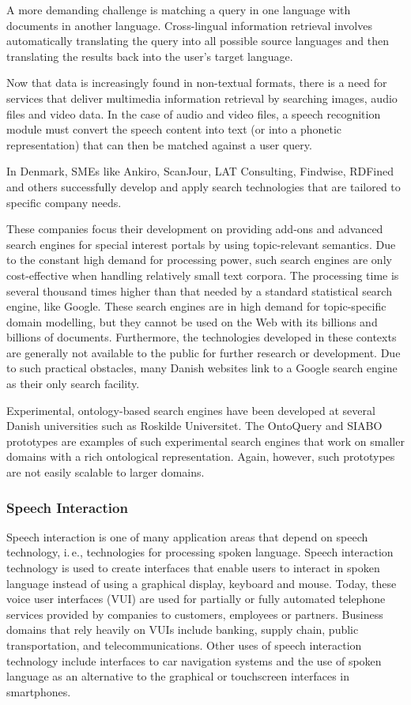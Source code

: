 \begin{multicols}{2}
A more demanding challenge is matching a query in one language with documents in another language. Cross-lingual information retrieval involves automatically translating the query into all possible source languages and then translating the results back into the user's target language.

Now that data is increasingly found in non-textual formats, there is a need for services that deliver multimedia information retrieval by searching images, audio files and video data. In the case of audio and video files, a speech recognition module must convert the speech content into text (or into a phonetic representation) that can then be matched against a user query.

In Denmark, SMEs like Ankiro, ScanJour, LAT Consulting, Findwise, RDFined and others successfully develop and apply search technologies that are tailored to specific company needs.

These companies focus their development on providing add-ons and advanced search engines for special interest portals by using topic-relevant semantics. Due to the constant high demand for processing power, such search engines are only cost-effective when handling relatively small text corpora. The processing time is several thousand times higher than that needed by a standard statistical search engine, like Google. These search engines are in high demand for topic-specific domain modelling, but they cannot be used on the Web with its billions and billions of documents. Furthermore, the technologies developed in these contexts are generally not available to the public for further research or development. Due to such practical obstacles, many Danish websites link to a Google search engine as their only search facility.

Experimental, ontology-based search engines have been developed at several Danish universities such as Roskilde Universitet. The OntoQuery and SIABO prototypes are examples of such experimental search engines that work on smaller domains with a rich ontological representation.  Again, however, such prototypes are not easily scalable to larger domains.

\subsubsection{Speech Interaction}

Speech interaction is one of many application areas that depend on speech technology, i.\,e., technologies for processing spoken language. Speech interaction technology is used to create interfaces that enable users to interact in spoken language instead of using a graphical display, keyboard and mouse.  Today, these voice user interfaces (VUI) are used for partially or fully automated telephone services provided by companies to customers, employees or partners. Business domains that rely heavily on VUIs include banking, supply chain, public transportation, and telecommunications. Other uses of speech interaction technology include interfaces to car navigation systems and the use of spoken language as an alternative to the graphical or touchscreen interfaces in smartphones.


\end{multicols}
